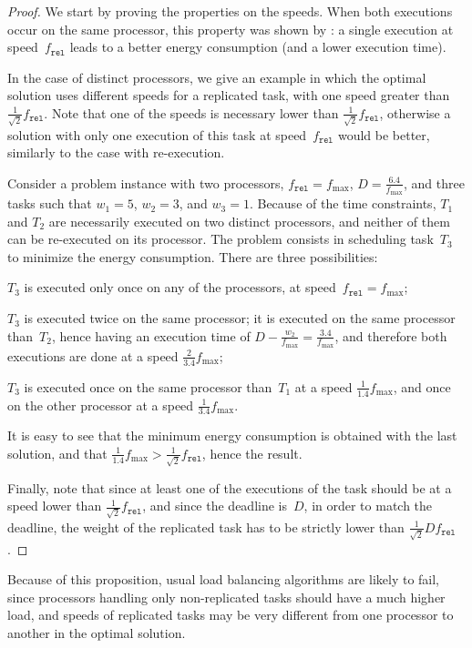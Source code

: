 \documentclass[a4paper]{article}
\theoremstyle{plain}
\theoremstyle{definition}
\theoremstyle{remark}
\newcommand{\fmax}{\ensuremath{f_{\max}}\xspace}
\newcommand{\fr}{\ensuremath{f_{\texttt{rel}}}\xspace}
\begin{document}
\begin{proof}
  We start by proving the properties on the speeds.  
  When both executions occur on the same processor, this property was
  shown by \cite{rr7757}: a single execution at speed~\fr leads to a
  better energy consumption (and a lower execution time). 

  In the case of distinct processors, we give an example in which
  the optimal solution uses different speeds for a replicated task,
  with one speed greater than $\frac{1}{\sqrt{2}}\fr$. Note that one
  of the speeds is necessary lower than $\frac{1}{\sqrt{2}}\fr$,
  otherwise a solution with only one execution of this task at
  speed~\fr would be better, similarly to the case with re-execution. 

  Consider a problem instance with two processors, $\fr=\fmax$,
  $D=\frac{6.4}{\fmax}$, and three tasks such that $w_1 = 5$, $w_2=3$,
  and $w_3=1$.  Because of the time constraints, $T_1$ and $T_2$ are
  necessarily executed on two distinct processors, and neither of
  them can be re-executed on its processor.  The problem consists in
  scheduling task~$T_3$ to minimize the energy consumption. There are
  three possibilities: 
\begin{compactitem}
\item $T_3$ is executed only once on any of the processors, at
  speed~$\fr=\fmax$; 
\item $T_3$ is executed twice on the same processor; it is executed on
  the same processor than~$T_2$, hence having an execution time of
  $D-\frac{w_2}{\fmax} = \frac{3.4}{\fmax}$, and therefore both
  executions are done at a speed $\frac{2}{3.4}\fmax$; 
\item $T_3$ is executed once on the same processor than~$T_1$ at
      a speed $\frac{1}{1.4}\fmax$, and once on the other processor at
      a speed $\frac{1}{3.4}\fmax$. 
\end{compactitem} 
It is easy to see that the minimum energy consumption is obtained with
the last solution, and that $\frac{1}{1.4}\fmax >
\frac{1}{\sqrt{2}}\fr$, hence the result.  

Finally, note that since at least one of the executions of the task
should be at a speed lower than $\frac{1}{\sqrt{2}}\fr$, and since the
deadline is~$D$, in order to match the deadline, the weight of the
replicated task has to be strictly lower than
$\frac{1}{\sqrt{2}}D\fr$. 
\end{proof}

Because of this proposition, usual load balancing algorithms are
likely to fail, since processors handling only non-replicated tasks
should have a much higher load, and speeds of replicated tasks may be
very different from one processor to another in the optimal solution. 
\end{document}
